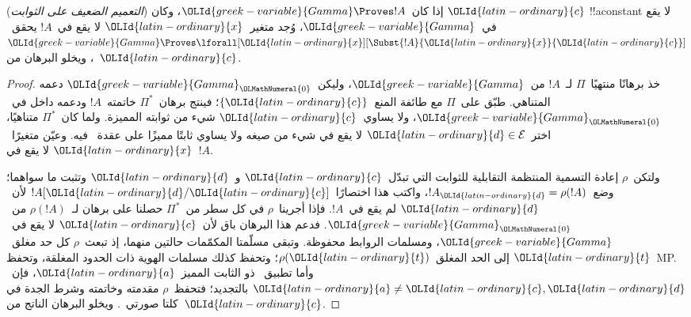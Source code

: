 \documentclass[../../../include/open-logic-section]{subfiles}
\begin{document}
\begin{thm}
(\emph{التعميم الضعيف على الثوابت}) إذا كان~$\OLId{greek-variable}{Gamma} \Proves !A$، وكان
$\OLId{latin-ordinary}{c}$ !!a{constant} لا يقع في~$\OLId{greek-variable}{Gamma}$، وُجد متغير~$\OLId{latin-ordinary}{x}$ لا يقع في~$!A$
يحقق~$\OLId{greek-variable}{Gamma} \Proves \lforall[\OLId{latin-ordinary}{x}][\Subst{!A}{\OLId{latin-ordinary}{x}}{\OLId{latin-ordinary}{c}}]$، ويخلو البرهان
من~$\OLId{latin-ordinary}{c}$.
\end{thm}

\begin{proof}
خذ برهانًا منتهيًا~$\Pi$ لـ~$!A$ من~$\OLId{greek-variable}{Gamma}$، وليكن~$\OLId{greek-variable}{Gamma}_\OLMathNumeral{0}$
دعمه المتناهي. طبّق  على~$\Pi$ مع طائفة
المنع~$\{\OLId{latin-ordinary}{c}\}$؛ فينتج برهان~$\Pi^*$ خاتمته~$!A$ ودعمه داخل
في~$\OLId{greek-variable}{Gamma}_\OLMathNumeral{0}$، ولا يساوي~$\OLId{latin-ordinary}{c}$ شيء من ثوابته المميزة. ولما كان~$\Pi^*$
متناهيًا، اختر~$\OLId{latin-ordinary}{d}\in\mathcal E$ لا يقع في شيء من صيغه ولا يساوي ثابتًا
مميزًا على عقدة~\QR{} فيه. وعيّن متغيرًا~$\OLId{latin-ordinary}{x}$ لا يقع في~$!A$.

ولتكن~$\rho$ إعادة التسمية المنتظمة التقابلية للثوابت التي تبدّل~$\OLId{latin-ordinary}{c}$ و~$\OLId{latin-ordinary}{d}$
وتثبت ما سواهما؛ وضع~$!A_\OLId{latin-ordinary}{d}=\rho(!A)$، واكتب هذا اختصارًا~$!A[\OLId{latin-ordinary}{d}/\OLId{latin-ordinary}{c}]$
لأن~$\OLId{latin-ordinary}{d}$ لم يقع في~$!A$. فإذا أجرينا~$\rho$ في كل سطر
من~$\Pi^*$ حصلنا على برهان لـ~$\rho(!A)$ من~$\OLId{greek-variable}{Gamma}_\OLMathNumeral{0}$. فدعم هذا البرهان باق لأن~$\OLId{latin-ordinary}{c}$
لا يقع في~$\OLId{greek-variable}{Gamma}$، ومسلمات الروابط محفوظة. وتبقى مسلّمتا المكمّمات حالتين
منهما، إذ تبعث~$\rho$ كل حد مغلق~$\OLId{latin-ordinary}{t}$ إلى الحد المغلق~$\rho(\OLId{latin-ordinary}{t})$؛ وتحفظ
كذلك مسلمات الهوية ذات الحدود المغلقة، وتحفظ~MP. وأما تطبيق~\QR{} ذو
الثابت المميز~$\OLId{latin-ordinary}{a}$، فإن~$\OLId{latin-ordinary}{a}\ne \OLId{latin-ordinary}{c},\OLId{latin-ordinary}{d}$ بالتجديد؛ فتحفظ~$\rho$ مقدمته
وخاتمته وشرط الجدة في كلتا صورتي~\QR{}.
ويخلو البرهان الناتج من~$\OLId{latin-ordinary}{c}$.


\end{proof}
\end{document}
